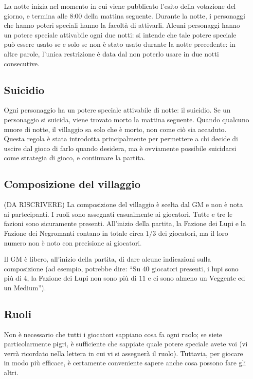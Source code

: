 \documentclass[a4paper,10pt]{article}
\begin{document}
La notte inizia nel momento in cui viene pubblicato l'esito della votazione del giorno, e termina alle 8:00 della mattina seguente.
Durante la notte, i personaggi che hanno poteri speciali hanno la facoltà di attivarli.
Alcuni personaggi hanno un potere speciale attivabile ogni due notti: si intende che tale potere speciale può essere usato se e solo se non è stato usato durante la notte precedente: in altre parole, l'unica restrizione è data dal non poterlo usare in due notti consecutive.


\subsection{Suicidio}

Ogni personaggio ha un potere speciale attivabile di notte: il suicidio.
Se un personaggio si suicida, viene trovato morto la mattina seguente. Quando qualcuno muore di notte, il villaggio sa solo che è morto, non come ciò sia accaduto.
Questa regola è stata introdotta principalmente per permettere a chi decide di uscire dal gioco di farlo quando desidera, ma è ovviamente possibile suicidarsi come strategia di gioco, e continuare la partita.


\subsection{Composizione del villaggio}

(DA RISCRIVERE)
La composizione del villaggio è scelta dal GM e non è nota ai partecipanti. I ruoli sono assegnati casualmente ai giocatori.
Tutte e tre le fazioni sono sicuramente presenti. All'inizio della partita, la Fazione dei Lupi e la Fazione dei Negromanti contano in totale circa $1/3$ dei giocatori, ma il loro numero non è noto con precisione ai giocatori.

Il GM è libero, all'inizio della partita, di dare alcune indicazioni sulla composizione (ad esempio, potrebbe dire: ``Su $40$ giocatori presenti, i lupi sono più di $4$, la Fazione dei Lupi non sono più di $11$ e ci sono almeno un Veggente ed un Medium'').


\subsection{Ruoli}

Non è necessario che tutti i giocatori sappiano cosa fa ogni ruolo; se siete particolarmente pigri, è sufficiente che sappiate quale potere speciale avete voi (vi verrà ricordato nella lettera in cui vi si assegnerà il ruolo). Tuttavia, per giocare in modo più efficace, è certamente conveniente sapere anche cosa possono fare gli altri.
\end{document}
